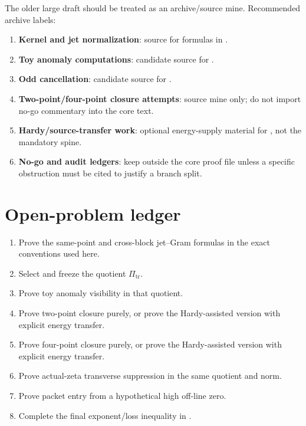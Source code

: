 \documentclass[11pt,a4paper]{amsart}
\newcommand{\trans}{\mathrm{tr}}
\theoremstyle{plain}
\theoremstyle{definition}
\begin{document}
The older large draft should be treated as an archive/source mine.  Recommended archive labels:
\begin{enumerate}[label=\textup{A\arabic*.},leftmargin=*]
\item \textbf{Kernel and jet normalization}: source for formulas in .
\item \textbf{Toy anomaly computations}: candidate source for .
\item \textbf{Odd cancellation}: candidate source for .
\item \textbf{Two-point/four-point closure attempts}: source mine only; do not import no-go commentary into the core text.
\item \textbf{Hardy/source-transfer work}: optional energy-supply material for , not the mandatory spine.
\item \textbf{No-go and audit ledgers}: keep outside the core proof file unless a specific obstruction must be cited to justify a branch split.
\end{enumerate}

\section{Open-problem ledger}
\label{app:open-problem-ledger}

\begin{enumerate}[label=\textup{O\arabic*.},leftmargin=*]
\item Prove the same-point and cross-block jet--Gram formulas in the exact conventions used here.
\item Select and freeze the quotient \(\Pi_{\trans}\).
\item Prove toy anomaly visibility in that quotient.
\item Prove two-point closure purely, or prove the Hardy-assisted version with explicit energy transfer.
\item Prove four-point closure purely, or prove the Hardy-assisted version with explicit energy transfer.
\item Prove actual-zeta transverse suppression in the same quotient and norm.
\item Prove packet entry from a hypothetical high off-line zero.
\item Complete the final exponent/loss inequality in .
\end{enumerate}
\end{document}
